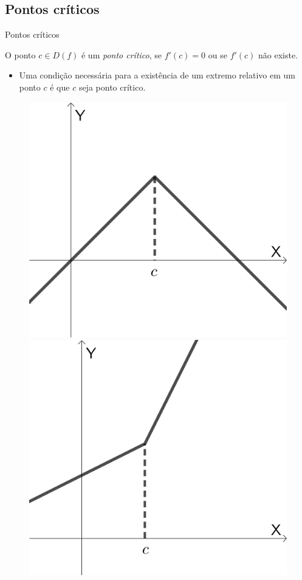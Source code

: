 \subsection{Pontos críticos}
\begin{frame}{Pontos críticos}
    \begin{theorem}
        O ponto $c\in D(f)$ é um \textit{ponto crítico}, se $f'(c)=0$ ou se $f'(c)$ não existe.
    \end{theorem}
    
    \begin{itemize}
        \item Uma condição necessária para a existência de um extremo relativo em um ponto $c$ é que $c$ seja ponto crítico.
    \end{itemize}
\begin{figure}
    \centering
    \includegraphics[width=.3\textwidth]{figuras/ex1-ponto-critico.png}
    \hspace{1cm}
    \includegraphics[width=.3\textwidth]{figuras/ex2-ponto-critico.png}
\end{figure}    
\end{frame}

